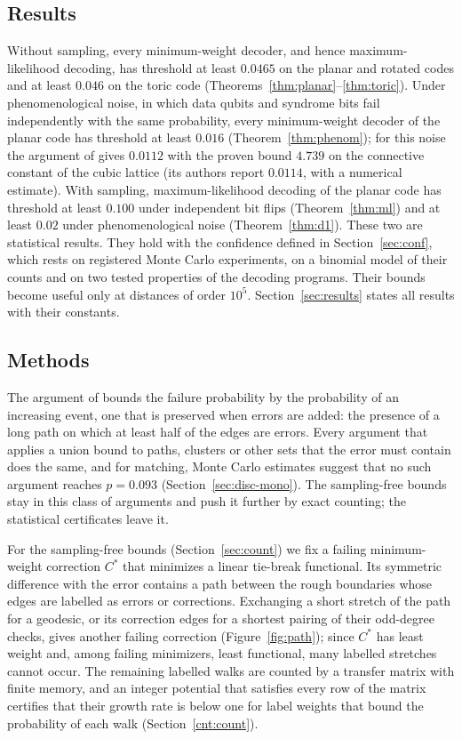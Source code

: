\documentclass[11pt]{amsart}
\theoremstyle{definition}
\theoremstyle{remark}
\numberwithin{equation}{section}
\begin{document}
\subsection{Results}
Without sampling, every minimum-weight decoder, and hence maximum-likelihood decoding, has threshold at least $0.0465$ on the planar and rotated codes and at least $0.046$ on the toric code (Theorems~\ref{thm:planar}--\ref{thm:toric}). Under phenomenological noise, in which data qubits and syndrome bits fail independently with the same probability, every minimum-weight decoder of the planar code has threshold at least $0.016$ (Theorem~\ref{thm:phenom}); for this noise the argument of \cite{DKLP02} gives $0.0112$ with the proven bound $4.739$ on the connective constant of the cubic lattice \cite{PT00} (its authors report $0.0114$, with a numerical estimate). With sampling, maximum-likelihood decoding of the planar code has threshold at least $0.100$ under independent bit flips (Theorem~\ref{thm:ml}) and at least $0.02$ under phenomenological noise (Theorem~\ref{thm:d1}). These two are statistical results. They hold with the confidence defined in Section~\ref{sec:conf}, which rests on registered Monte Carlo experiments, on a binomial model of their counts and on two tested properties of the decoding programs. Their bounds become useful only at distances of order $10^{5}$. Section~\ref{sec:results} states all results with their constants.

\subsection{Methods}\label{sec:intro-methods}
The argument of \cite{DKLP02} bounds the failure probability by the probability of an increasing event, one that is preserved when errors are added: the presence of a long path on which at least half of the edges are errors. Every argument that applies a union bound to paths, clusters or other sets that the error must contain does the same, and for matching, Monte Carlo estimates suggest that no such argument reaches $p=0.093$ (Section~\ref{sec:disc-mono}). The sampling-free bounds stay in this class of arguments and push it further by exact counting; the statistical certificates leave it.

For the sampling-free bounds (Section~\ref{sec:count}) we fix a failing minimum-weight correction $C^\ast$ that minimizes a linear tie-break functional. Its symmetric difference with the error contains a path between the rough boundaries whose edges are labelled as errors or corrections. Exchanging a short stretch of the path for a geodesic, or its correction edges for a shortest pairing of their odd-degree checks, gives another failing correction (Figure~\ref{fig:path}); since $C^\ast$ has least weight and, among failing minimizers, least functional, many labelled stretches cannot occur. The remaining labelled walks are counted by a transfer matrix with finite memory, and an integer potential that satisfies every row of the matrix certifies that their growth rate is below one for label weights that bound the probability of each walk (Section~\ref{cnt:count}).
\end{document}
